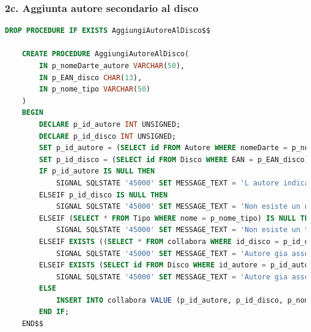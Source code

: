 \documentclass{article}
\begin{document}
\subsubsection*{2c. Aggiunta autore secondario al disco}
\begin{lstlisting}[language=SQL]
    DROP PROCEDURE IF EXISTS AggiungiAutoreAlDisco$$

    CREATE PROCEDURE AggiungiAutoreAlDisco(
        IN p_nomeDarte_autore VARCHAR(50),
        IN p_EAN_disco CHAR(13),
        IN p_nome_tipo VARCHAR(50)
    )
    BEGIN
        DECLARE p_id_autore INT UNSIGNED;
        DECLARE p_id_disco INT UNSIGNED;
        SET p_id_autore = (SELECT id FROM Autore WHERE nomeDarte = p_nomeDarte_autore);
        SET p_id_disco = (SELECT id FROM Disco WHERE EAN = p_EAN_disco);
        IF p_id_autore IS NULL THEN	
            SIGNAL SQLSTATE '45000' SET MESSAGE_TEXT = 'L autore indicato non esiste';
        ELSEIF p_id_disco IS NULL THEN
            SIGNAL SQLSTATE '45000' SET MESSAGE_TEXT = 'Non esiste un disco con questo EAN';
        ELSEIF (SELECT * FROM Tipo WHERE nome = p_nome_tipo) IS NULL THEN
            SIGNAL SQLSTATE '45000' SET MESSAGE_TEXT = 'Non esiste un tipo con questo nome';
        ELSEIF EXISTS ((SELECT * FROM collabora WHERE id_disco = p_id_disco AND id_autore = p_id_autore AND nome_Tipo = p_nome_tipo)) THEN
            SIGNAL SQLSTATE '45000' SET MESSAGE_TEXT = 'Autore gia associato al disco in quel ruolo';
        ELSEIF EXISTS (SELECT id FROM Disco WHERE id_autore = p_id_autore and id = p_id_disco) THEN 
            SIGNAL SQLSTATE '45000' SET MESSAGE_TEXT = 'Autore gia associato al disco in quel ruolo';
        ELSE
            INSERT INTO collabora VALUE (p_id_autore, p_id_disco, p_nome_tipo);
        END IF;
    END$$
\end{lstlisting}
            
\end{document}
